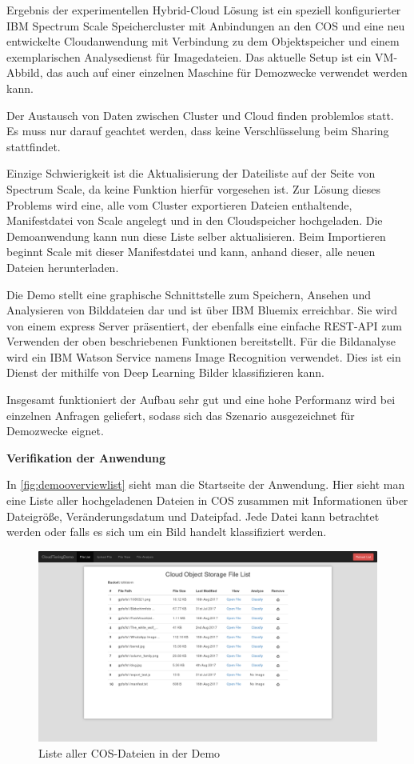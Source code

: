 Ergebnis der experimentellen Hybrid-Cloud Lösung ist ein speziell konfigurierter IBM Spectrum Scale Speichercluster mit Anbindungen an den \ac{COS} und eine neu entwickelte Cloudanwendung mit Verbindung zu dem Objektspeicher und einem exemplarischen Analysedienst für Imagedateien.
Das aktuelle Setup ist ein VM-Abbild, das auch auf einer einzelnen Maschine für Demozwecke verwendet werden kann.

Der Austausch von Daten zwischen Cluster und Cloud finden problemlos statt. Es muss nur darauf geachtet werden, dass keine Verschlüsselung beim Sharing stattfindet.

Einzige Schwierigkeit ist die Aktualisierung der Dateiliste auf der Seite von Spectrum Scale, da keine Funktion hierfür vorgesehen ist. Zur Lösung dieses Problems wird eine, alle vom Cluster exportieren Dateien enthaltende, Manifestdatei von Scale angelegt und in den Cloudspeicher hochgeladen. Die Demoanwendung kann nun diese Liste selber aktualisieren. Beim Importieren beginnt Scale mit dieser Manifestdatei und kann, anhand dieser, alle neuen Dateien herunterladen.

Die Demo stellt eine graphische Schnittstelle zum Speichern, Ansehen und Analysieren von Bilddateien dar und ist über IBM Bluemix erreichbar. Sie wird von einem express Server präsentiert, der ebenfalls eine einfache REST-API zum Verwenden der oben beschriebenen Funktionen bereitstellt. Für die Bildanalyse wird ein IBM Watson Service namens Image Recognition verwendet. Dies ist ein Dienst der mithilfe von Deep Learning Bilder klassifizieren kann.

Insgesamt funktioniert der Aufbau sehr gut und eine hohe Performanz wird bei einzelnen Anfragen geliefert, sodass sich das Szenario ausgezeichnet für Demozwecke eignet.

\textbf{Verifikation der Anwendung}

In \autoref{fig:demooverviewlist} sieht man die Startseite der Anwendung. Hier sieht man eine Liste aller hochgeladenen Dateien in \ac{COS} zusammen mit Informationen über Dateigröße, Veränderungsdatum und Dateipfad. Jede Datei kann betrachtet werden oder falls es sich um ein Bild handelt klassifiziert werden. 

\begin{figure}[hbt]
	\centering
	\includegraphics[scale=0.25]{images/demo-overview-list}
	\caption{Liste aller COS-Dateien in der Demo}
	\label{fig:demooverviewlist}
\end{figure}

